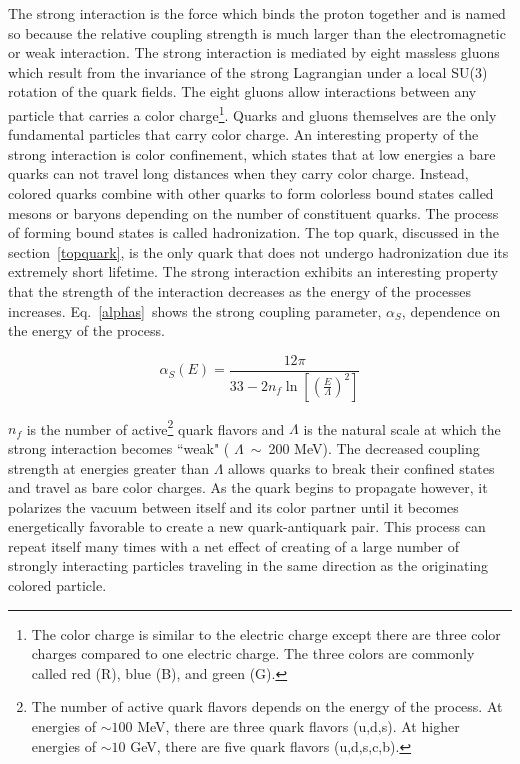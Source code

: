 The strong interaction is the force which binds the proton together and is named so because the relative coupling strength is much larger than the electromagnetic or weak interaction. The strong interaction is mediated by eight massless gluons which result from the invariance of the strong Lagrangian under a local SU(3) rotation of the quark fields. The eight gluons allow interactions between any particle that carries a color charge\footnote{The color charge is similar to the electric charge except there are three color charges compared to one electric charge. The three colors are commonly called red (R), blue (B), and green (G).}. Quarks and gluons themselves are the only fundamental particles that carry color charge. An interesting property of the strong interaction is color confinement, which states that at low energies a bare quarks can not travel long distances when they carry color charge. Instead, colored quarks combine with other quarks to form colorless bound states called mesons or baryons depending on the number of constituent quarks. The process of forming bound states is called hadronization. The top quark, discussed in the section~\ref{topquark}, is the only quark that does not undergo hadronization due its extremely short lifetime.
The strong interaction exhibits an interesting property that the strength of the interaction decreases as the energy of the processes increases. Eq.~\ref{alphas}~shows the strong coupling parameter, $\alpha_{S}$, dependence on the energy of the process. 

\begin{equation}
\label{alphas}
\alpha_{S}(E) = \frac{12\pi}{33-2n_{f}\ln\left[\left(\frac{E}{\Lambda}\right)^{2}\right]}
\end{equation}

\noindent $n_{f}$ is the number of active\footnote{The number of active quark flavors depends on the energy of the process. At energies of $\sim100$ MeV, there are three quark flavors (u,d,s). At higher energies of $\sim10$ GeV, there are five quark flavors (u,d,s,c,b).} quark flavors and $\Lambda$ is the natural scale at which the strong interaction becomes ``weak" ( $\Lambda~\sim~$200 MeV).
The decreased coupling strength at energies greater than $\Lambda$ allows quarks to break their confined states and travel as bare color charges. As the quark begins to propagate however, it polarizes the vacuum between itself and its color partner until it becomes energetically favorable to create a new quark-antiquark pair. This process can repeat itself many times with a net effect of creating of a large number of strongly interacting particles traveling in the same direction as the originating colored particle. 


